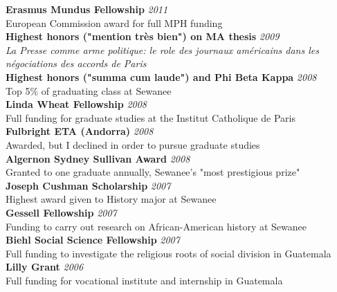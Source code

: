 \documentclass[11pt]{article}
\begin{document}
\noindent \textbf{Erasmus Mundus Fellowship} \hfill \emph{2011}\\
\noindent European Commission award for full MPH funding \\

\noindent \textbf{Highest honors ("mention très bien") on MA thesis} \hfill \emph{2009}\\
\noindent \textit{La Presse comme arme politique: le role des journaux américains dans les négociations des accords de Paris}\\

\noindent \textbf{Highest honors ("summa cum laude") and Phi Beta Kappa}  \hfill \emph{2008}\\
\noindent Top 5\% of graduating class at Sewanee  \\

\noindent \textbf{Linda Wheat Fellowship}  \hfill \emph{2008}\\
\noindent Full funding for graduate studies at the Institut Catholique de Paris  \\

\noindent \textbf{Fulbright ETA (Andorra)}  \hfill \emph{2008}\\
\noindent Awarded, but I declined in order to pursue graduate studies \\

\noindent \textbf{Algernon Sydney Sullivan Award}  \hfill \emph{2008}\\
\noindent Granted to one graduate annually, Sewanee's "most prestigious prize" \\

\noindent \textbf{Joseph Cushman Scholarship}  \hfill \emph{2007}\\
\noindent Highest award given to History major at Sewanee \\

\noindent \textbf{Gessell Fellowship}  \hfill \emph{2007}\\
\noindent Funding to carry out research on African-American history at Sewanee\\

\noindent \textbf{Biehl Social Science Fellowship}  \hfill \emph{2007}\\
\noindent Full funding to investigate the religious roots of social division in Guatemala\\

\noindent \textbf{Lilly Grant}  \hfill \emph{2006}\\
\noindent Full funding for vocational institute and internship in Guatemala\\
\end{document}
